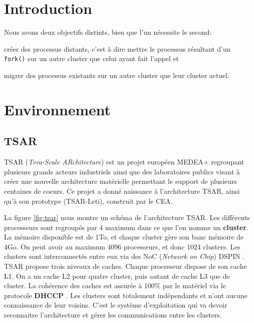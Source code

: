 \section{Introduction}
\label{sec:introduction}


  Nous avons deux objectifs distints, bien que l'un nécessite le second:
  \benumline \item créer des processus distants, c'est à dire mettre le
  processus résultant d'un \texttt{fork()} sur un autre cluster que celui ayant
  fait l'appel et \item migrer des processus existants sur un autre cluster que
  leur cluster actuel\eenumline.

\section{Environnement}
\label{sec:environnement}

  \subsection{TSAR}
  \label{subsec:tsar}


    TSAR (\textit{Tera-Scale ARchitecture})\cite{tsar} est un projet européen
    MEDEA+ regroupant plusieurs grands acteurs industriels ainsi que des
    laboratoires publics visant à créer une nouvelle architecture matérielle
    permettant le support de plusieurs centaines de coeurs. Ce projet a donné
    naissance à l'architecture TSAR, ainsi qu'à son prototype (TSAR-Leti),
    construit par le CEA.

    La figure \ref{fig:tsar} nous montre un schéma de l'architecture TSAR. Les
    différents processeurs sont regroupés par 4 maximum dans ce que l'on nomme
    un \textbf{cluster}. La mémoire disponible est de 1To, et chaque cluster
    gère son banc mémoire de 4Go. On peut avoir au maximum 4096 processeurs, et
    donc 1024 clusters. Les clusters sont interconnectés entre eux via des NoC
    (\textit{Network on Chip}) DSPIN
    . TSAR propose trois niveaux de caches. Chaque processeur dispose de son
    cache L1. On a un cache L2 pour quatre cluster, puis autant de cache L3 que
    de cluster. La cohérence des caches est assurée à 100\% par le matériel via
    le protocole \textbf{DHCCP}
    . Les clusters sont totalement indépendants et n'ont aucune connaissance de
    leur voisins. C'est le système d'exploitation qui va devoir reconnaitre
    l'architecture et gérer les communications entre les clusters.

